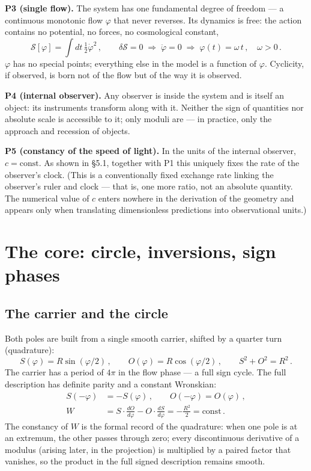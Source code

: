\documentclass{article}
\begin{document}
\medskip
\noindent\textbf{P3 (single flow).} The system has one fundamental degree of freedom --- a continuous monotonic flow $\varphi$ that never reverses. Its dynamics is free: the action contains no potential, no forces, no cosmological constant,
\begin{equation}
\mathcal{S}[\varphi] = \int dt\, \tfrac{1}{2}\dot{\varphi}^2\,, \qquad \delta\mathcal{S} = 0 \;\Rightarrow\; \ddot{\varphi} = 0 \;\Rightarrow\; \varphi(t) = \omega\,t\,, \quad \omega > 0\,.
\end{equation}
$\varphi$ has no special points; everything else in the model is a function of $\varphi$. Cyclicity, if observed, is born not of the flow but of the way it is observed.

\medskip
\noindent\textbf{P4 (internal observer).} Any observer is inside the system and is itself an object: its instruments transform along with it. Neither the sign of quantities nor absolute scale is accessible to it; only moduli are --- in practice, only the approach and recession of objects.

\medskip
\noindent\textbf{P5 (constancy of the speed of light).} In the units of the internal observer, $c = \text{const}$. As shown in \S5.1, together with P1 this uniquely fixes the rate of the observer's clock.
(This is a conventionally fixed exchange rate linking the observer's ruler and clock --- that is, one more ratio, not an absolute quantity. The numerical value of $c$ enters nowhere in the derivation of the geometry and appears only when translating dimensionless predictions into observational units.)

\section{The core: circle, inversions, sign phases}

\subsection{The carrier and the circle}

Both poles are built from a single smooth carrier, shifted by a quarter turn (quadrature):
\begin{equation}
S(\varphi) = R\sin(\varphi/2)\,, \qquad O(\varphi) = R\cos(\varphi/2)\,, \qquad S^2 + O^2 = R^2\,.
\end{equation}
The carrier has a period of $4\pi$ in the flow phase --- a full sign cycle. The full description has definite parity and a constant Wronskian:
\begin{align}
S(-\varphi) &= -S(\varphi)\,, \qquad O(-\varphi) = O(\varphi)\,, \\
W &= S\cdot\frac{dO}{d\varphi} - O\cdot\frac{dS}{d\varphi} = -\frac{R^2}{2} = \text{const}\,.
\end{align}
The constancy of $W$ is the formal record of the quadrature: when one pole is at an extremum, the other passes through zero; every discontinuous derivative of a modulus (arising later, in the projection) is multiplied by a paired factor that vanishes, so the product in the full signed description remains smooth.
\end{document}
